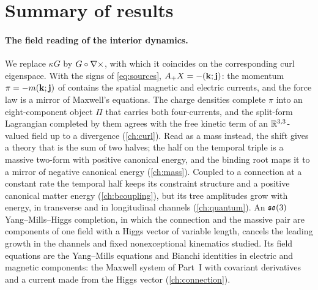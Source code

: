 \section{Summary of results}

\paragraph{The field reading of the interior dynamics.} We replace $\kappa G$ by $G\circ\nabla\times$, with which it coincides on the corresponding
curl eigenspace. With the signs of \cref{eq:sources}, $A_+X=-(\mathbf k;\mathbf j)$: the momentum $\pi=-m(\mathbf k;\mathbf j)$ of  contains the
spatial magnetic and electric currents, and the force law is a mirror of Maxwell's equations. The charge densities complete $\pi$ into an
eight-component object $\Pi$ that carries both four-currents, and the split-form Lagrangian completed by them agrees with the free kinetic
term of an $\mathbb{R}^{3,3}$-valued field up to a divergence (\cref{ch:curl}). Read as a mass instead, the shift gives a theory that is the sum of
two halves; the half on the temporal triple is a massive two-form with positive canonical energy, and the binding root maps it to a mirror of
negative canonical energy (\cref{ch:mass}). Coupled to a connection at a constant rate the temporal half keeps its constraint structure and a
positive canonical matter energy (\cref{ch:bcoupling}), but its tree amplitudes grow with energy, in transverse and in longitudinal channels
(\cref{ch:quantum}). An $\mathfrak{so}(3)$ Yang--Mills--Higgs completion, in which the connection and the massive pair are components of one field with a
Higgs vector of variable length, cancels the leading growth in the channels and fixed nonexceptional kinematics studied. Its field equations are the Yang--Mills equations and Bianchi identities in electric and magnetic components: the Maxwell system
of Part~I with covariant derivatives and a current made from the Higgs vector (\cref{ch:connection}).

